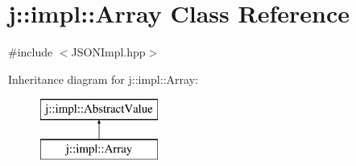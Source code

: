 \hypertarget{classj_1_1impl_1_1_array}{\section{j\-:\-:impl\-:\-:Array Class Reference}
\label{classj_1_1impl_1_1_array}
}


{\ttfamily \#include $<$J\-S\-O\-N\-Impl.\-hpp$>$}

Inheritance diagram for j\-:\-:impl\-:\-:Array\-:\begin{figure}[H]
\begin{center}
\leavevmode
\includegraphics[height=2.000000cm]{classj_1_1impl_1_1_array}
\end{center}
\end{figure}
